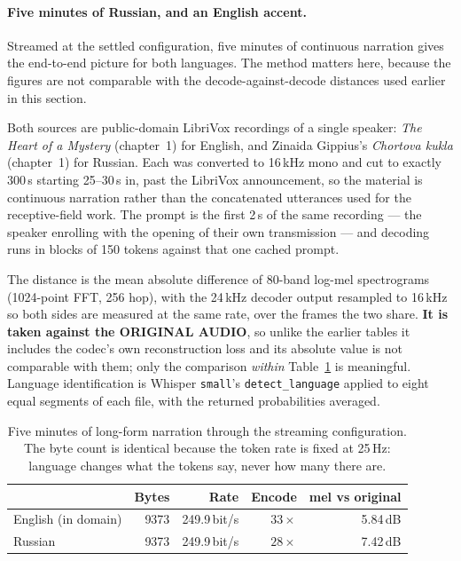 \paragraph{Five minutes of Russian, and an English accent.}
\label{sec:voice_russian}

Streamed at the settled configuration, five minutes of continuous
narration gives the end-to-end picture for both languages.  The method
matters here, because the figures are not comparable with the
decode-against-decode distances used earlier in this section.

Both sources are public-domain LibriVox recordings of a single speaker:
\emph{The Heart of a Mystery} (chapter~1) for English, and Zinaida
Gippius's \emph{Chortova kukla} (chapter~1) for Russian.  Each was
converted to 16\,kHz mono and cut to exactly 300\,s starting 25--30\,s
in, past the LibriVox announcement, so the material is continuous
narration rather than the concatenated utterances used for the
receptive-field work.  The prompt is the first 2\,s of the same
recording --- the speaker enrolling with the opening of their own
transmission --- and decoding runs in blocks of 150 tokens against that
one cached prompt.

The distance is the mean absolute difference of 80-band log-mel
spectrograms (1024-point FFT, 256 hop), with the 24\,kHz decoder output
resampled to 16\,kHz so both sides are measured at the same rate, over
the frames the two share.  \textbf{It is taken against the ORIGINAL
AUDIO}, so unlike the earlier tables it includes the codec's own
reconstruction loss and its absolute value is not comparable with them;
only the comparison \emph{within} Table~\ref{tab:voice_longform} is
meaningful.  Language identification is Whisper \texttt{small}'s
\texttt{detect\_language} applied to eight equal segments of each file,
with the returned probabilities averaged.

\begin{table}[H]
    \centering
    \caption{Five minutes of long-form narration through the streaming
             configuration.  The byte count is identical because the
             token rate is fixed at 25\,Hz: language changes what the
             tokens say, never how many there are.}
    \label{tab:voice_longform}
    \small
    \begin{tabular}{@{}lrrrr@{}}
    \toprule
    & \textbf{Bytes} & \textbf{Rate} & \textbf{Encode} &
    \textbf{mel vs original} \\
    \midrule
    English (in domain) & 9373 & 249.9\,bit/s & $33\times$ & 5.84\,dB \\
    Russian             & 9373 & 249.9\,bit/s & $28\times$ & 7.42\,dB \\
    \bottomrule
    \end{tabular}
\end{table}

